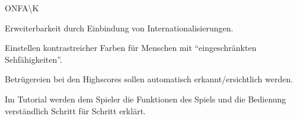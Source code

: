 \begin{ids}{\gls{ONFA\K}}

 	\id[110] Erweiterbarkeit durch Einbindung von Internationalisierungen.
 	
 	\id[120] Einstellen kontrastreicher Farben für Menschen mit "`eingeschränkten Sehfähigkeiten"'.
 	
  	\id[130] Betrügereien bei den Highscores sollen automatisch erkannt/ersichtlich werden.
  	
  	\id[140] Im Tutorial werden dem Spieler die Funktionen des Spiels und die Bedienung verständlich Schritt für Schritt erklärt.  
	
\end{ids}

~\\
